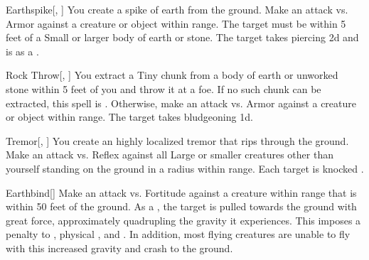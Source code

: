\lowercase{\hypertarget{spell:Earthspike}{}}\label{spell:Earthspike}
\begin{freeability}[\nth{1}]{\hypertarget{spell:Earthspike}{Earthspike}}[, ]
You create a spike of earth from the ground.
Make an attack vs. Armor against a creature or object within \rngmed range.
The target must be within 5 feet of a Small or larger body of earth or stone.
\hit The target takes piercing  \minus2d and is  as a .
\end{freeability}
\vspace{0.25em}



\lowercase{\hypertarget{spell:Rock Throw}{}}\label{spell:Rock Throw}
\begin{freeability}[\nth{1}]{\hypertarget{spell:Rock Throw}{Rock Throw}}[, ]
You extract a Tiny chunk from a body of earth or unworked stone within 5 feet of you and throw it at a foe.
If no such chunk can be extracted, this spell is .
Otherwise, make an attack vs. Armor against a creature or object within \rngmed range.
\hit The target takes bludgeoning  \plus1d.
\end{freeability}
\vspace{0.25em}



\lowercase{\hypertarget{spell:Tremor}{}}\label{spell:Tremor}
\begin{freeability}[\nth{1}]{\hypertarget{spell:Tremor}{Tremor}}[, ]
You create an highly localized tremor that rips through the ground.
Make an attack vs. Reflex against all Large or smaller creatures other than yourself standing on the ground in a \areasmall radius within \rngmed range.
\hit Each target is knocked .
\end{freeability}
\vspace{0.25em}



\lowercase{\hypertarget{spell:Earthbind}{}}\label{spell:Earthbind}
\begin{freeability}[\nth{2}]{\hypertarget{spell:Earthbind}{Earthbind}}[]
Make an attack vs. Fortitude against a creature within \rngmed range that is within 50 feet of the ground.
\hit As a , the target is pulled towards the ground with great force, approximately quadrupling the gravity it experiences.
This imposes a  penalty to , physical , and .
In addition, most flying creatures are unable to fly with this increased gravity and crash to the ground.
\end{freeability}
\vspace{0.25em}



